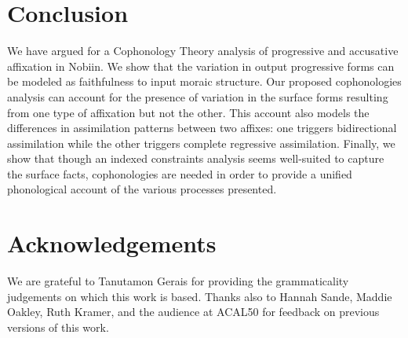 \documentclass[output=paper]{langscibook}
\begin{document}
\section{Conclusion} \label{conclusion}
We have argued for a Cophonology Theory analysis of progressive and accusative affixation in Nobiin. We show that the variation in output progressive forms can be modeled as faithfulness to input moraic structure. Our proposed cophonologies analysis can account for the presence of variation in the surface forms resulting from one type of affixation but not the other. This account also models the differences in assimilation patterns between two affixes: one triggers bidirectional assimilation while the other triggers complete regressive assimilation. Finally, we show that though an indexed constraints analysis seems well-suited to capture the surface facts, cophonologies are needed in order to provide a unified phonological account of the various processes presented.




\section*{Acknowledgements}
We are grateful to Tanutamon Gerais for providing the grammaticality judgements on which this work is based. Thanks also to Hannah Sande, Maddie Oakley, Ruth Kramer, and the audience at ACAL50 for feedback on previous versions of this work.

{\sloppy\printbibliography[heading=subbibliography,notkeyword=this]}
\end{document}
